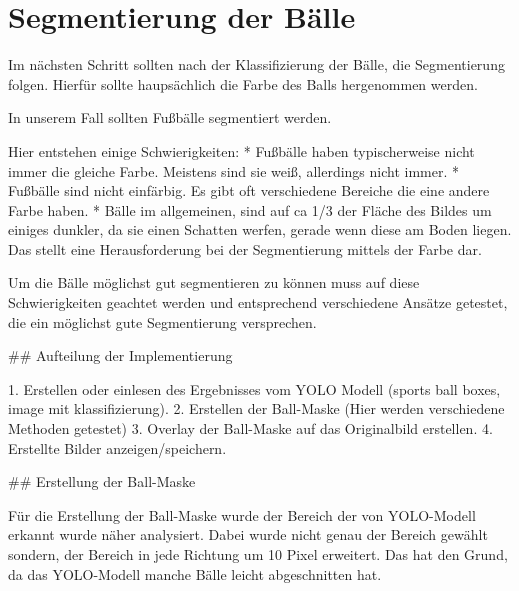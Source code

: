 \section{Segmentierung der Bälle}

Im nächsten Schritt sollten nach der Klassifizierung der Bälle, die Segmentierung folgen. Hierfür sollte haupsächlich die Farbe des Balls hergenommen werden.

In unserem Fall sollten Fußbälle segmentiert werden.

Hier entstehen einige Schwierigkeiten:
* Fußbälle haben typischerweise nicht immer die gleiche Farbe. Meistens sind sie weiß, allerdings nicht immer.
* Fußbälle sind nicht einfärbig. Es gibt oft verschiedene Bereiche die eine andere Farbe haben.
* Bälle im allgemeinen, sind auf ca 1/3 der Fläche des Bildes um einiges dunkler, da sie einen Schatten werfen, gerade wenn diese am Boden liegen. Das stellt eine Herausforderung bei der Segmentierung mittels der Farbe dar.

Um die Bälle möglichst gut segmentieren zu können muss auf diese Schwierigkeiten geachtet werden und entsprechend verschiedene Ansätze getestet, die ein möglichst gute Segmentierung versprechen.


## Aufteilung der Implementierung

1. Erstellen oder einlesen des Ergebnisses vom YOLO Modell (sports ball boxes, image mit klassifizierung).
2. Erstellen der Ball-Maske (Hier werden verschiedene Methoden getestet)
3. Overlay der Ball-Maske auf das Originalbild erstellen.
4. Erstellte Bilder anzeigen/speichern.



## Erstellung der Ball-Maske

Für die Erstellung der Ball-Maske wurde der Bereich der von YOLO-Modell erkannt wurde näher analysiert. Dabei wurde nicht genau der Bereich gewählt sondern, der Bereich in jede Richtung um 10 Pixel erweitert. Das hat den Grund, da das YOLO-Modell manche Bälle leicht abgeschnitten hat.

